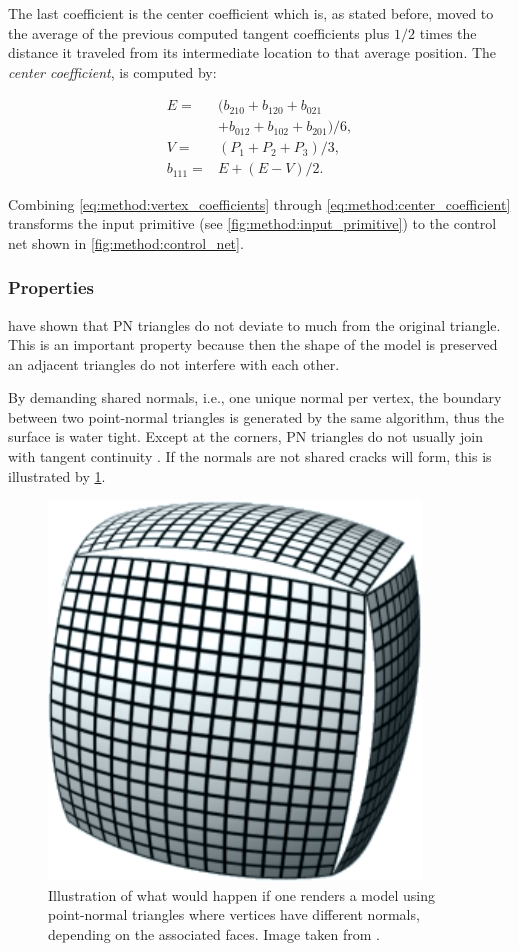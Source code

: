 	The last coefficient is the center coefficient which is, as stated before, moved to the average of the previous computed tangent coefficients plus $1/2$ times the distance it traveled from its intermediate location to that average position. The \textit{center coefficient}, is computed by:

	\begin{align}\label{eq:method:center_coefficient}
		E = {}& (b_{210} + b_{120} + b_{021} \nonumber \\
			{}& + b_{012} + b_{102} + b_{201}) / 6, \nonumber\\
		V = {}& (P_1 + P_2 + P_3) / 3, \\
		b_{111} = {}& E + (E - V) / 2. \nonumber
	\end{align}

	Combining \eqref{eq:method:vertex_coefficients} through \eqref{eq:method:center_coefficient} transforms the input primitive (see \cref{fig:method:input_primitive}) to the control net shown in \cref{fig:method:control_net}.

\subsubsection{Properties}
\label{sss:method:geometry:properties}
	\citeauthor{vlachos2001curved} have shown that PN triangles do not deviate to much from the original triangle. This is an important property because then the shape of the model is preserved an adjacent triangles do not interfere with each other. 

	By demanding shared normals, i.e., one unique normal per vertex, the boundary between two point-normal triangles is generated by the same algorithm, thus the surface is water tight. Except at the corners, PN triangles do not usually join with tangent continuity \cite{vlachos2001curved}. If the normals are not shared cracks will form, this is illustrated by \cref{fig:method:cracks}.

	\begin{figure}
		\centering
		\includegraphics[width=0.4\columnwidth]{./content/img/method/cracks.png}
		\caption{Illustration of what would happen if one renders a model using point-normal triangles where vertices have different normals, depending on the associated faces. Image taken from \cite{mcdonald2010crack}.}
		\label{fig:method:cracks}
	\end{figure}
